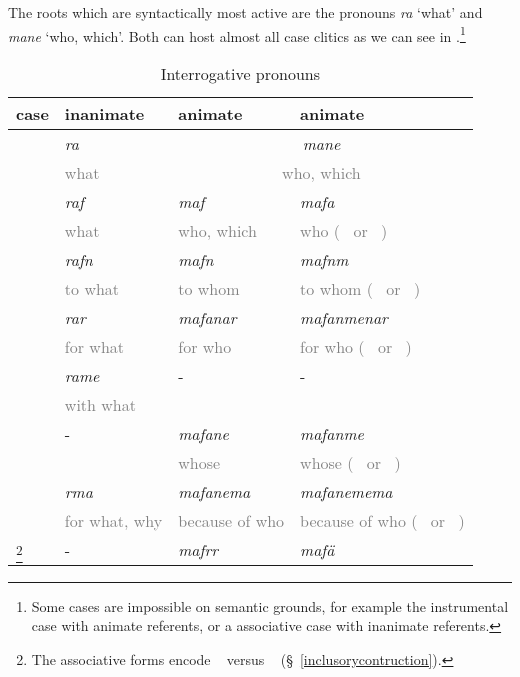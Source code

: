 The roots which are syntactically most active are the  pronouns \emph{ra} `what' and \emph{mane} `who, which'. Both can host almost all case clitics as we can see in .\footnote{Some cases are impossible on semantic grounds, for example the instrumental case with animate referents, or a associative case with inanimate referents.}

\begin{table}
\caption{Interrogative pronouns}
\label{interrog}
	\begin{tabularx}{\textwidth}{XXXX}
		\lsptoprule
		{case} & {inanimate} & {animate} \Sg & {animate} \Nsg\\
		\hline
		\Abs & \emph{ra}&\multicolumn{2}{|c|}{\emph{mane}}\\
		&\textcolor{gray}{\footnotesize what} &\multicolumn{2}{|c|}{\textcolor{gray}{\footnotesize who, which}}\\\cline{3-4}
		\Erg{} &\emph{raf}&\emph{maf} &\emph{mafa}\\
		& \textcolor{gray}{\footnotesize what} &\textcolor{gray}{\footnotesize who, which} &\textcolor{gray}{\footnotesize who (\Du~ or \Pl~)}\\
		\Dat &\emph{rafn}&\emph{mafn} &\emph{mafnm}\\
		&\textcolor{gray}{\footnotesize to what} &\textcolor{gray}{\footnotesize to whom} &\textcolor{gray}{\footnotesize to whom (\Du~ or \Pl~)}\\
		\Purp &\emph{rar}&\emph{mafanar} &\emph{mafanmenar}\\
		&\textcolor{gray}{\footnotesize for what} &\textcolor{gray}{\footnotesize for who} &\textcolor{gray}{\footnotesize for who (\Du~ or \Pl~)}\\
		\Ins &\emph{rame}&-&-\\
		&\textcolor{gray}{\footnotesize with what}&&\\
		\Poss &- &\emph{mafane} &\emph{mafanme}\\
		& &\textcolor{gray}{\footnotesize whose} &\textcolor{gray}{\footnotesize whose (\Du~ or \Pl~)}\\
		\Char &\emph{rma} &\emph{mafanema} &\emph{mafanemema}\\
		&\textcolor{gray}{\footnotesize for what, why}&\textcolor{gray}{\footnotesize because of who}&\textcolor{gray}{\footnotesize because of who (\Du~ or \Pl~)}\\
		\Assoc\footnote{The associative forms encode \Du~ versus \Pl~ (\S~\ref{inclusorycontruction}).} &- &\emph{mafrr} &\emph{mafä}\\

\end{tabularx}
\end{table}
